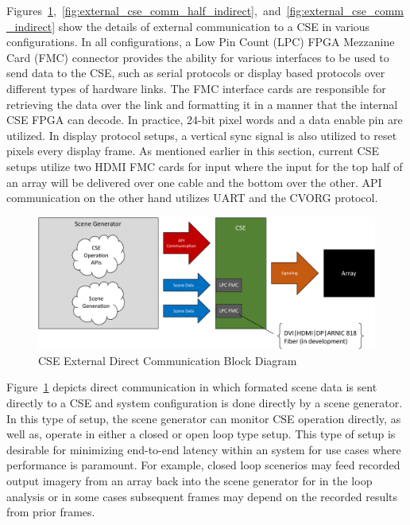     Figures~\ref{fig:external_cse_comm_direct},~\ref{fig:external_cse_comm_half_indirect},~and~\ref{fig:external_cse_comm_indirect} show the details of external communication to a CSE in various configurations. In all configurations, a Low Pin Count (LPC) FPGA Mezzanine Card (FMC) connector provides the ability for various interfaces to be used to send data to the CSE, such as serial protocols or display based protocols over different types of hardware links. The FMC interface cards are responsible for retrieving the data over the link and formatting it in a manner that the internal CSE FPGA can decode. In practice, 24-bit pixel words and a data enable pin are utilized. In display protocol setups, a vertical sync signal is also utilized to reset pixels every display frame. As mentioned earlier in this section, current CSE setups utilize two HDMI FMC cards for input where the input for the top half of an array will be delivered over one cable and the bottom over the other. API communication on the other hand utilizes UART and the CVORG protocol.

    \begin{figure}
        \centering
        \includegraphics[width=1.0\textwidth]{fig/external_cse_comm_direct.pdf}
        \caption{CSE External Direct Communication Block Diagram}
        \label{fig:external_cse_comm_direct}
    \end{figure}

    Figure~\ref{fig:external_cse_comm_direct} depicts direct communication in which formated scene data is sent directly to a CSE and system configuration is done directly by a scene generator. In this type of setup, the scene generator can monitor CSE operation directly, as well as, operate in either a closed or open loop type setup. This type of setup is desirable for minimizing end-to-end latency within an system for use cases where performance is paramount. For example, closed loop scenerios may feed recorded output imagery from an array back into the scene generator for in the loop analysis or in some cases subsequent frames may depend on the recorded results from prior frames.

